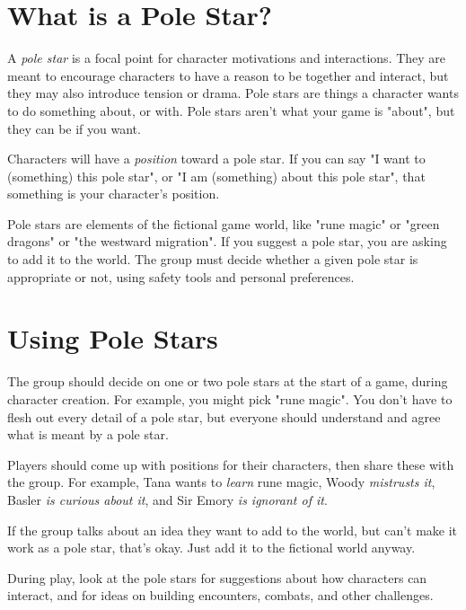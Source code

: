 \documentclass[10pt,oneside,letterpaper,landscape]{memoir}
\begin{document}
\begin{multicols}{3}
\vspace{2mm}

\section{What is a Pole Star?}

A \textit{pole star} is a focal point for character motivations and interactions. They are meant to encourage characters to have a reason to be together and interact, but they may also introduce tension or drama. Pole stars are things a character wants to do something about, or with. Pole stars aren't what your game is "about", but they can be if you want.

Characters will have a \textit{position} toward a pole star. If you can say "I want to (something) this pole star", or "I am (something) about this pole star", that something is your character's position.

Pole stars are elements of the fictional game world, like "rune magic" or "green dragons" or "the westward migration". If you suggest a pole star, you are asking to add it to the world. The group must decide whether a given pole star is appropriate or not, using safety tools and personal preferences.

\section{Using Pole Stars}

The group should decide on one or two pole stars at the start of a game, during character creation. For example, you might pick "rune magic". You don't have to flesh out every detail of a pole star, but everyone should understand and agree what is meant by a pole star.

Players should come up with positions for their characters, then share these with the group. For example, Tana wants to \textit{learn} rune magic, Woody \textit{mistrusts it}, Basler \textit{is curious about it}, and Sir Emory \textit{is ignorant of it}.

If the group talks about an idea they want to add to the world, but can't make it work as a pole star, that's okay. Just add it to the fictional world anyway.

During play, look at the pole stars for suggestions about how characters can interact, and for ideas on building encounters, combats, and other challenges.


\end{multicols}
\end{document}
